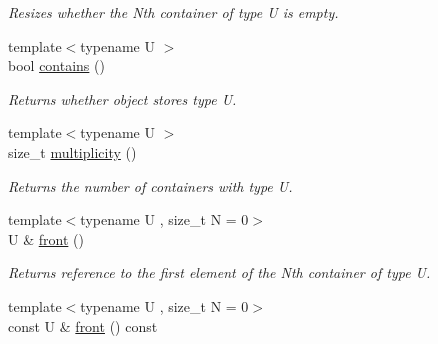 \begin{DoxyCompactItemize}
\begin{DoxyCompactList}\small\item\em Resizes whether the Nth container of type U is empty. \end{DoxyCompactList}\item 
\hypertarget{classheterogeneous_1_1heteroqueue_3_01_t_00_01_types_8_8_8_4_ab4d959faa61b045d4fb8befe36aa8b35}{}{\footnotesize template$<$typename U $>$ }\\bool \hyperlink{classheterogeneous_1_1heteroqueue_3_01_t_00_01_types_8_8_8_4_ab4d959faa61b045d4fb8befe36aa8b35}{contains} ()\label{classheterogeneous_1_1heteroqueue_3_01_t_00_01_types_8_8_8_4_ab4d959faa61b045d4fb8befe36aa8b35}

\begin{DoxyCompactList}\small\item\em Returns whether object stores type U. \end{DoxyCompactList}\item 
\hypertarget{classheterogeneous_1_1heteroqueue_3_01_t_00_01_types_8_8_8_4_a377ee54f59298baaf219d21599e3315d}{}{\footnotesize template$<$typename U $>$ }\\size\+\_\+t \hyperlink{classheterogeneous_1_1heteroqueue_3_01_t_00_01_types_8_8_8_4_a377ee54f59298baaf219d21599e3315d}{multiplicity} ()\label{classheterogeneous_1_1heteroqueue_3_01_t_00_01_types_8_8_8_4_a377ee54f59298baaf219d21599e3315d}

\begin{DoxyCompactList}\small\item\em Returns the number of containers with type U. \end{DoxyCompactList}\item 
\hypertarget{classheterogeneous_1_1heteroqueue_3_01_t_00_01_types_8_8_8_4_a896d814147a3b6c39ea11fa1f85c14a3}{}{\footnotesize template$<$typename U , size\+\_\+t N = 0$>$ }\\U \& \hyperlink{classheterogeneous_1_1heteroqueue_3_01_t_00_01_types_8_8_8_4_a896d814147a3b6c39ea11fa1f85c14a3}{front} ()\label{classheterogeneous_1_1heteroqueue_3_01_t_00_01_types_8_8_8_4_a896d814147a3b6c39ea11fa1f85c14a3}

\begin{DoxyCompactList}\small\item\em Returns reference to the first element of the Nth container of type U. \end{DoxyCompactList}\item 
\hypertarget{classheterogeneous_1_1heteroqueue_3_01_t_00_01_types_8_8_8_4_a84cb23669d4b4f43cde3474c985c6ebb}{}{\footnotesize template$<$typename U , size\+\_\+t N = 0$>$ }\\const U \& \hyperlink{classheterogeneous_1_1heteroqueue_3_01_t_00_01_types_8_8_8_4_a84cb23669d4b4f43cde3474c985c6ebb}{front} () const \label{classheterogeneous_1_1heteroqueue_3_01_t_00_01_types_8_8_8_4_a84cb23669d4b4f43cde3474c985c6ebb}


\end{DoxyCompactItemize}
